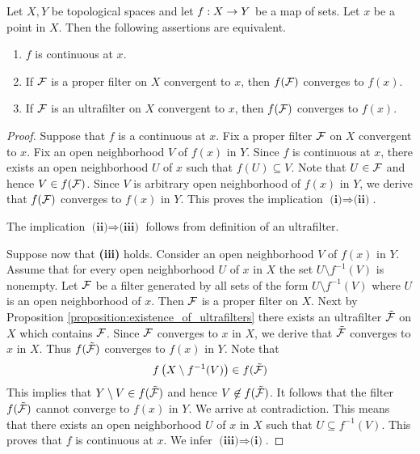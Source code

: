 \documentclass[10pt]{amsart}
\begin{document}
\begin{proposition}\label{proposition:characterization_of_continuous_maps_in_terms_of_filters}
	Let $X,Y$ be topological spaces and let $f:X\rightarrow Y$ be a map of sets. Let $x$ be a point in $X$. Then the following assertions are equivalent.
	\begin{enumerate}[label=\emph{\textbf{(\roman*)}}, leftmargin=*]
		\item $f$ is continuous at $x$.
		\item If ${\mathcal F}$ is a proper filter on $X$ convergent to $x$, then $f({\mathcal F})$ converges to $f(x)$.
		\item If ${\mathcal F}$ is an ultrafilter on $X$ convergent to $x$, then $f({\mathcal F})$ converges to $f(x)$.
	\end{enumerate}
\end{proposition}
\begin{proof}
	Suppose that $f$ is a continuous at $x$. Fix a proper filter ${\mathcal F}$ on $X$ convergent to $x$. Fix an open neighborhood $V$ of $f(x)$ in $Y$. Since $f$ is continuous at $x$, there exists an open neighborhood $U$ of $x$ such that $f(U) \subseteq V$. Note that $U \in {\mathcal F}$ and hence $V \in f({\mathcal F})$. Since $V$ is arbitrary open neighborhood of $f(x)$ in $Y$, we derive that $f({\mathcal F})$ converges to $f(x)$ in $Y$. This proves the implication $\textbf{(i)}\Rightarrow \textbf{(ii)}$.

	The implication $\textbf{(ii)}\Rightarrow \textbf{(iii)}$ follows from definition of an ultrafilter.

	Suppose now that \textbf{(iii)} holds. Consider an open neighborhood $V$ of $f(x)$ in $Y$. Assume that for every open neighborhood $U$ of $x$ in $X$ the set $U\setminus f^{-1}(V)$ is nonempty. Let ${\mathcal F}$ be a filter generated by all sets of the form $U\setminus f^{-1}(V)$ where $U$ is an open neighborhood of $x$. Then ${\mathcal F}$ is a proper filter on $X$. Next by Proposition \ref{proposition:existence_of_ultrafilters} there exists an ultrafilter $\tilde{{\mathcal F}}$ on $X$ which contains ${\mathcal F}$. Since ${\mathcal F}$ converges to $x$ in $X$, we derive that $\tilde{{\mathcal F}}$ converges to $x$ in $X$. Thus $f(\tilde{{\mathcal F}})$ converges to $f(x)$ in $Y$. Note that
	$$f\left(X\setminus f^{-1}(V)\right) \in f(\tilde{{\mathcal F}})$$
	This implies that $Y\setminus V \in f(\tilde{{\mathcal F}})$ and hence $V \not \in f(\tilde{{\mathcal F}})$. It follows that the filter $f(\tilde{{\mathcal F}})$ cannot converge to $f(x)$ in $Y$. We arrive at contradiction. This means that there exists an open neighborhood $U$ of $x$ in $X$ such that $U \subseteq f^{-1}(V)$. This proves that $f$ is continuous at $x$. We infer $\textbf{(iii)}\Rightarrow \textbf{(i)}$.
\end{proof}
\end{document}
